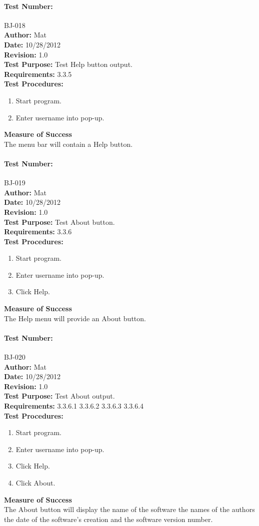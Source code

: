 \documentclass{article}
\begin{document}
\paragraph{Test Number:} BJ-018\\
\textbf{Author:} Mat\\
\textbf{Date:} 10/28/2012\\
\textbf{Revision:} 1.0\\
\textbf{Test Purpose:} Test Help button output.\\
\textbf{Requirements:} 3.3.5 \\
\textbf{Test Procedures:} 
\begin{enumerate}
\item Start program.
\item Enter username into pop-up.
\end{enumerate}
\textbf{Measure of Success}\\The menu bar will contain a Help button.
\paragraph{Test Number:} BJ-019\\
\textbf{Author:} Mat\\
\textbf{Date:} 10/28/2012\\
\textbf{Revision:} 1.0\\
\textbf{Test Purpose:} Test About button.\\
\textbf{Requirements:} 3.3.6 \\
\textbf{Test Procedures:} 
\begin{enumerate}
\item Start program.
\item Enter username into pop-up.
\item Click Help.
\end{enumerate}
\textbf{Measure of Success}\\The Help menu will provide an About button.
\paragraph{Test Number:} BJ-020\\
\textbf{Author:} Mat\\
\textbf{Date:} 10/28/2012\\
\textbf{Revision:} 1.0\\
\textbf{Test Purpose:} Test About output.\\
\textbf{Requirements:} 3.3.6.1 3.3.6.2 3.3.6.3 3.3.6.4 \\
\textbf{Test Procedures:} 
\begin{enumerate}
\item Start program.
\item Enter username into pop-up.
\item Click Help.
\item Click About.
\end{enumerate}
\textbf{Measure of Success}\\The About button will display the name of the software the names of the authors the date of the software's creation and the software version number.
\end{document}
